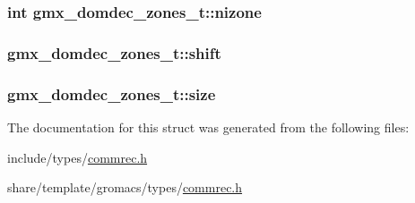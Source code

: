 \hypertarget{structgmx__domdec__zones__t_aa95e6c5e8b4b28874a53f46107e74e46}{
\subsubsection[{nizone}]{\setlength{\rightskip}{0pt plus 5cm}int {\bf gmx\-\_\-domdec\-\_\-zones\-\_\-t\-::nizone}}}\label{structgmx__domdec__zones__t_aa95e6c5e8b4b28874a53f46107e74e46}
\hypertarget{structgmx__domdec__zones__t_acfec2e09cd9a1ba99ce23056c8c47b09}{
\subsubsection[{shift}]{ {\bf gmx\-\_\-domdec\-\_\-zones\-\_\-t\-::shift}}}\label{structgmx__domdec__zones__t_acfec2e09cd9a1ba99ce23056c8c47b09}
\hypertarget{structgmx__domdec__zones__t_af6e8bdea264ad4f400686afe61196fa0}{
\subsubsection[{size}]{ {\bf gmx\-\_\-domdec\-\_\-zones\-\_\-t\-::size}}}\label{structgmx__domdec__zones__t_af6e8bdea264ad4f400686afe61196fa0}


\-The documentation for this struct was generated from the following files\-:\begin{DoxyCompactItemize}
\item 
include/types/\hyperlink{include_2types_2commrec_8h}{commrec.\-h}\item 
share/template/gromacs/types/\hyperlink{share_2template_2gromacs_2types_2commrec_8h}{commrec.\-h}\end{DoxyCompactItemize}
